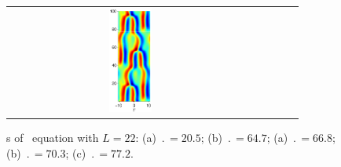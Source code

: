 \begin{figure}[t]
\begin{center}
\begin{tabular}{ccccc}
\includegraphics[width=0.18\textwidth]{figs/ks22rpo077.2-00.00.eps}
\end{tabular}
\end{center}
\caption{\Po s of \KS\ equation with $L = 22$: 
(a) $\period{} = 20.5$; 
(b) $\period{} = 64.7$; 
(a) $\period{} = 66.8$; 
(b) $\period{} = 70.3$; 
(c) $\period{} = 77.2$.} \label{f:ks22rposPO}
\end{figure}

